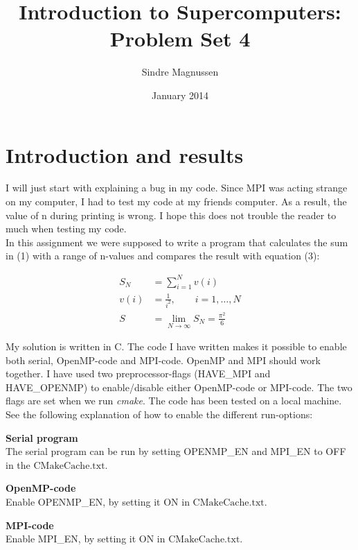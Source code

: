 \documentclass{article}
\title{Introduction to Supercomputers: Problem Set 4}
\author{Sindre Magnussen}
\date{January 2014}
\begin{document}
\maketitle

\section*{Introduction and results}
	I will just start with explaining a bug in my code. Since MPI was acting strange on my computer, I had to test my code at my friends computer. As a result, the value of n during printing is wrong. I hope this does not trouble the reader to much when testing my code. \\
	In this assignment we were supposed to write a program that calculates the sum in (1) with a range of n-values and compares the result with equation (3):
	
	\begin{align}
	S_N &= \sum_{i = 1}^{N} v(i) \\
	v(i) &= \frac{1}{i^2},\qquad i = 1,\ldots,N \\
	S &= \lim_{N\to\infty} S_N = \frac{\pi^2}{6}
	\end{align}
	
	My solution is written in C. The code I have written makes it possible to enable both serial, OpenMP-code and MPI-code. OpenMP and MPI should work together. I have used two preprocessor-flags (HAVE\_MPI and HAVE\_OPENMP) to enable/disable either OpenMP-code or MPI-code. The two flags are set when we run \emph{cmake}. The code has been tested on a local machine. See the following explanation of how to enable the different run-options: 

\begin{list}{}{}
\item \textbf{Serial program} \\
	The serial program can be run by setting OPENMP\_EN and MPI\_EN to OFF in the $\mathrm{CMakeCache.txt}$.
	
\item \textbf{OpenMP-code} \\
	Enable OPENMP\_EN, by setting it ON in $\mathrm{CMakeCache.txt}$. 
	
\item \textbf{MPI-code} \\
	Enable MPI\_EN, by setting it ON in $\mathrm{CMakeCache.txt}$. 
\end{list}

\newpage
\end{document}
